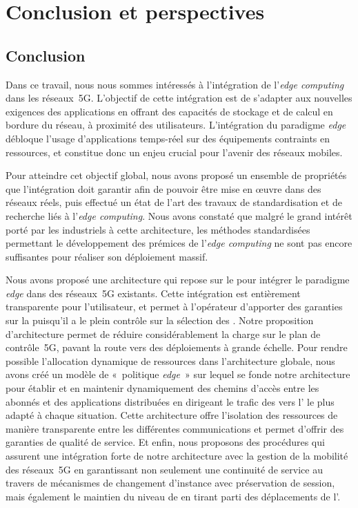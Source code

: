 \documentclass[../main.tex]{subfiles}
\begin{document}
\initSubfile
\chapter*{Conclusion et perspectives}
\label{ch:conclusion-perspectives}

\section*{Conclusion}
Dans ce travail, nous nous sommes intéressés à l’intégration de l’\textit{edge computing} dans les réseaux~5G.
L’objectif de cette intégration est de s’adapter aux nouvelles exigences des applications en offrant des capacités de stockage et de calcul en bordure du réseau, à proximité des utilisateurs.
L’intégration du paradigme \textit{edge} débloque l’usage d’applications temps-réel sur des équipements contraints en ressources, et constitue donc un enjeu crucial pour l’avenir des réseaux mobiles.

Pour atteindre cet objectif global, nous avons proposé un ensemble de propriétés que l’intégration doit garantir afin de pouvoir être mise en œuvre dans des réseaux réels, puis effectué un état de l’art des travaux de standardisation et de recherche liés à l’\textit{edge computing}.
Nous avons constaté que malgré le grand intérêt porté par les industriels à cette architecture, les méthodes standardisées permettant le développement des prémices de l’\textit{edge computing} ne sont pas encore suffisantes pour réaliser son déploiement massif.

Nous avons proposé une architecture qui repose sur le  pour intégrer le paradigme \textit{edge} dans des réseaux~5G existants.
Cette intégration est entièrement transparente pour l’utilisateur, et permet à l’opérateur d’apporter des garanties sur la  puisqu’il a le plein contrôle sur la sélection des .
Notre proposition d’architecture permet de réduire considérablement la charge sur le plan de contrôle~5G, pavant la route vers des déploiements à grande échelle.
Pour rendre possible l’allocation dynamique de ressources dans l’architecture globale, nous avons créé un modèle de «~politique \textit{edge}~» sur lequel se fonde notre architecture pour établir et en maintenir dynamiquement des chemins d’accès entre les abonnés et des applications distribuées en dirigeant le trafic des  vers l’ le plus adapté à chaque situation.
Cette architecture offre l’isolation des ressources de manière transparente entre les différentes communications et permet d’offrir des garanties de qualité de service.
Et enfin, nous proposons des procédures qui assurent une intégration forte de notre architecture avec la gestion de la mobilité des réseaux~5G en garantissant non seulement une continuité de service au travers de mécanismes de changement d’instance avec préservation de session, mais également le maintien du niveau de  en tirant parti des déplacements de l’.
\end{document}
